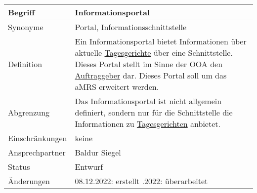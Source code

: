 \begin{table}[H]
    \centering
    \label{gls:informationsportal}
    \begin{tabularx}{\textwidth}{| l | X |}
        \hline
        Begriff         & Informationsportal                                                                                                                                                                                                                                                      \\
        \hline
        Synonyme        & Portal, Informationsschnittstelle                                                                                                                                                                                                                                       \\
        \hline
        Definition      & Ein Informationsportal bietet Informationen über aktuelle \hyperref[gls:tagesgericht]{Tagesgerichte} über eine Schnittstelle. Dieses Portal stellt im Sinne der OOA den \hyperref[gls:auftraggeber]{Auftraggeber} dar. Dieses Portal soll um das aMRS erweitert werden. \\
        \hline
        Abgrenzung      & Das Informationsportal ist nicht allgemein definiert, sondern nur für die Schnittstelle die Informationen zu \hyperref[gls:tagesgericht]{Tagesgerichten} anbietet.                                                                                                      \\
        \hline
        Einschränkungen & keine                                                                                                                                                                                                                                                                   \\
        \hline
        Ansprechpartner & Baldur Siegel                                                                                                                                                                                                                                                           \\
        \hline
        Status          & Entwurf                                                                                                                                                                                                                                                                 \\
        \hline
        Änderungen      & 08.12.2022: erstellt
        \newline 16.12.2022: überarbeitet                                                                                                                                                                                                                                                         \\
        \hline
    \end{tabularx}
\end{table}



